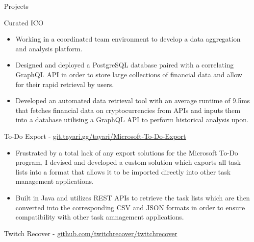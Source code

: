 \documentclass{article}
\newlength{\tabin}
\newlength{\secsep}
\newcommand{\lineunder}{\vspace*{-8pt} \\ \hspace*{-6pt} \hrulefill \\ \vspace*{-15pt}}
\newenvironment{tabbedsection}[1]{
  \begin{list}{}{
      \setlength{\itemsep}{0pt}
      \setlength{\labelsep}{0pt}
      \setlength{\labelwidth}{0pt}
      \setlength{\leftmargin}{\tabin}
      \setlength{\rightmargin}{\tabin}
      \setlength{\listparindent}{0pt}
      \setlength{\parsep}{0pt}
      \setlength{\parskip}{0pt}
      \setlength{\partopsep}{0pt}
      \setlength{\topsep}{#1}
    }
  \item[]
}{\end{list}}
\newenvironment{resume_section}[1]{
  \filbreak
  \vspace{2\secsep}
  \textsc{\color{blue}\large#1}
  \lineunder
  \begin{tabbedsection}{\secsep}
}{\end{tabbedsection}}
\newenvironment{resume_subsection}[2][]{
  \textbf{\color{BlueViolet}#2} \hfill {\normalsize #1} \hspace{-5em} 
  \begin{tabbedsection}{0.5\secsep}
}{\end{tabbedsection}}
\newenvironment{subitems}{
  \renewcommand{\labelitemi}{-}
  \begin{itemize}
      \setlength{\labelsep}{1em}
}{\end{itemize}}
\begin{document}
\vspace{2\secsep}

\begin{resume_section}{Projects}
	\begin{resume_subsection}{Curated ICO}
		\begin{subitems}
			\item Working in a coordinated team environment to develop a data aggregation and analysis platform.
            \item Designed and deployed a PostgreSQL database paired with a correlating GraphQL API in order to store large collections of financial data and allow for their rapid retrieval by users. 
            \item Developed an automated data retrieval tool with an average runtime of 9.5ms that fetches financial data on cryptocurrencies from APIs and inputs them into a database utilising a GraphQL API to perform historical analysis upon. 
		\end{subitems}
	\end{resume_subsection}
	\vspace{2\secsep}
	\begin{resume_subsection}[(February 2021)]{To-Do Export - \faGitlab \hspace{0.01cm} \href{https://git.tayari.gg/tayari/Microsoft-To-Do-Export}{git.tayari.gg/tayari/Microsoft-To-Do-Export}}
  		\begin{subitems} 
            \item Frustrated by a total lack of any export solutions for the Microsoft To-Do program, I devised and developed a custom solution which exports all task lists into a format that allows it to be imported directly into other task management applications.
  			\item Built in Java and utilizes REST APIs to retrieve the task lists which are then converted into the corresponding CSV and JSON formats in order to ensure compatibility with other task amnagement applications.
    		\end{subitems}
  	\end{resume_subsection}
  	\vspace{2\secsep}
	\begin{resume_subsection}{Twitch Recover - \faGithub \hspace{0.01cm} \href{https://github.com/twitchrecover/twitchrecover}{github.com/twitchrecover/twitchrecover}}  
		\begin{subitems}

\end{subitems}
\end{resume_subsection}
\end{resume_section}
\end{document}
